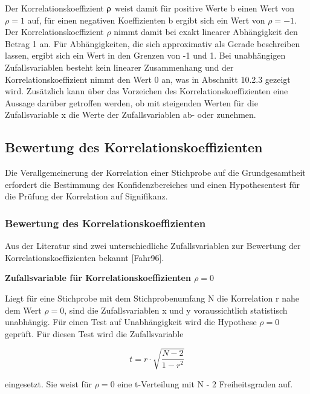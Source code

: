 \noindent Der Korrelationskoeffizient $\rhoup$ weist damit f\"{u}r positive Werte b einen Wert von $\rho = 1$ auf, f\"{u}r einen negativen Koeffizienten b ergibt sich ein Wert von $\rho = - 1$. Der Korrelationskoeffizient $\rho$ nimmt damit bei exakt linearer Abh\"{a}ngigkeit den Betrag 1 an. F\"{u}r Abh\"{a}ngigkeiten, die sich approximativ als Gerade beschreiben lassen, ergibt sich ein Wert in den Grenzen von -1 und 1. Bei unabh\"{a}ngigen Zufallsvariablen besteht kein linearer Zusammenhang und der Korrelationskoeffizient nimmt den Wert 0 an, was in Abschnitt 10.2.3 gezeigt wird. Zus\"{a}tzlich kann \"{u}ber das Vorzeichen des Korrelationskoeffizienten eine Aussage dar\"{u}ber getroffen werden, ob mit steigenden Werten f\"{u}r die Zufallsvariable x die Werte der Zufallsvariablen ab- oder zunehmen.

\clearpage

\subsection{Bewertung des Korrelationskoeffizienten}

\noindent Die Verallgemeinerung der Korrelation einer Stichprobe auf die Grundgesamtheit erfordert die Bestimmung des Konfidenzbereiches und einen Hypothesentest f\"{u}r die Pr\"{u}fung der Korrelation auf Signifikanz.

\subsubsection{Bewertung des Korrelationskoeffizienten}

\noindent Aus der Literatur sind zwei unterschiedliche Zufallsvariablen zur Bewertung der Korrelationskoeffizienten bekannt [Fahr96]. \bigskip

{\selectfont
\noindent\textbf{Zufallsvariable f\"{u}r Korrelationskoeffizienten $\rho = 0$}}\smallskip

\noindent Liegt f\"{u}r eine Stichprobe mit dem Stichprobenumfang N die Korrelation r nahe dem Wert $\rho = 0$, sind die Zufallsvariablen x und y voraussichtlich statistisch unabh\"{a}ngig. F\"{u}r einen Test auf Unabh\"{a}ngigkeit wird die Hypothese $\rho = 0$ gepr\"{u}ft. F\"{u}r diesen Test wird die Zufallsvariable 

\begin{equation}\label{eq:tenfourtyone}
t=r\cdot \sqrt{\dfrac{N-2}{1-r^{2}}}  
\end{equation}

\noindent eingesetzt. Sie weist f\"{u}r $\rho = 0$ eine t-Verteilung mit N - 2 Freiheitsgraden auf.  \bigskip

